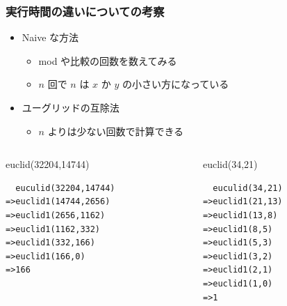 \begin{frame}[fragile]
\frametitle{実行時間の違いについての考察}
  \begin{itemize}
\item Naive な方法
    \begin{itemize}
\item mod や比較の回数を数えてみる
\item $n$ 回で $n$ は $x$ か $y$ の小さい方になっている
    \end{itemize}
\item ユーグリッドの互除法
    \begin{itemize}
\item $n$ よりは少ない回数で計算できる
    \end{itemize}
  \end{itemize}
  \begin{columns}[t]
    \begin{column}{0.45\textwidth}
      \begin{itembox}{euclid(32204,14744)}
\scriptsize
        \begin{verbatim}
  euculid(32204,14744)
=>euclid1(14744,2656)
=>euclid1(2656,1162)
=>euclid1(1162,332)
=>euclid1(332,166)
=>euclid1(166,0)
=>166
        \end{verbatim}
      \end{itembox}
    \end{column}
    \begin{column}{0.45\textwidth}
      \begin{itembox}{euclid(34,21)}
\scriptsize
        \begin{verbatim}
  euculid(34,21)
=>euclid1(21,13)
=>euclid1(13,8)
=>euclid1(8,5)
=>euclid1(5,3)
=>euclid1(3,2)
=>euclid1(2,1)
=>euclid1(1,0)
=>1
        \end{verbatim}
      \end{itembox}
    \end{column}
  \end{columns}
\end{frame}
